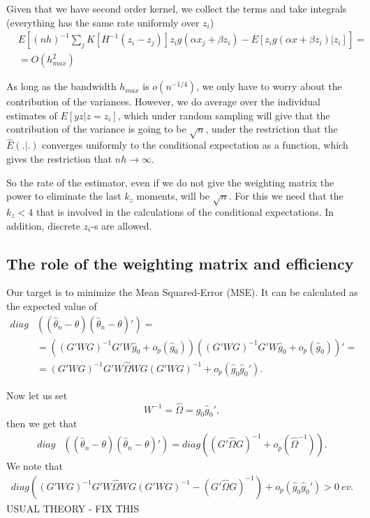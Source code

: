 \documentclass{article}
\theoremstyle{definition}
\theoremstyle{remark}
\begin{document}
Given that we have  second order kernel, we collect the terms and take integrals (everything has the same rate uniformly over $z_i$)
\begin{align}
    &E[(nh)^{-1}\sum_j K[H^{-1}(z_i-z_j)] z_i g(\alpha x_j + \beta z_i)-E[z_i g(\alpha x + \beta z_i)|z_i]]= \\
    &=O(h_{max}^2) \nonumber
\end{align}

As long as the bandwidth $h_{max}$ is $o(n^{-1/4})$, we only have to worry about the contribution of the variances. However, we do average over the individual estimates of $E[yz|z=z_i]$, which under random sampling will give that the contribution of the variance is going to be $\sqrt{n}$, under the restriction that the $\hat{E}(.|.)$ converges uniformly to the conditional expectation as a function, which gives the restriction that $nh \rightarrow \infty$.

So the rate of the estimator, even if we do not give the weighting matrix the power to eliminate the last $k_z$ moments, will be $\sqrt{n}$. For this we need that the $k_z<4$ that is involved in the calculations of the conditional expectations. In addition, discrete $z_i$-s are allowed.

\subsection{The role of the weighting matrix and efficiency}
Our target is to minimize the Mean Squared-Error (MSE). It can be calculated as the expected value of
\begin{align}
diag&\left((\hat{\theta}_n -\theta)(\hat{\theta}_n -\theta)'\right)=\\ &=((G'WG)^{-1}G'W \hat{g}_0 + o_p(\hat{g}_0))((G'WG)^{-1}G'W \hat{g}_0 + o_p(\hat{g}_0))'= \nonumber \\
&= (G'WG)^{-1} G'W \hat{\Omega}W G (G'WG)^{-1}  + o_p(\hat{g}_0\hat{g}_0').
\end{align}

Now let us set
\[W^{-1}=\hat{\Omega}=\hat{g}_0\hat{g}_0',
\]
then we get that
\begin{align}
diag&\left((\hat{\theta}_n -\theta)(\hat{\theta}_n -\theta)'\right)= diag\left((G'\hat{\Omega} G)^{-1} + o_p(\hat{\Omega}^{-1})\right).
\end{align}
We note that
\begin{align}
diag\left((G'WG)^{-1} G'W \hat{\Omega}W G (G'WG)^{-1}-  (G'\hat{\Omega} G)^{-1}\right) + o_p(\hat{g}_0\hat{g}_0')> 0 \ ev.
\end{align}
{\color{red} USUAL THEORY  -  FIX THIS}
\end{document}
